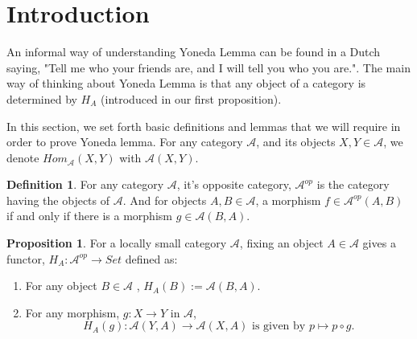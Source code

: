 \documentclass[a4paper]{article}
\theoremstyle{definition}
\newtheorem{definition}[theorem]{Definition}
\newtheorem{prop}[theorem]{Proposition}
\begin{document}
\section{Introduction}

An informal way of understanding Yoneda Lemma can be found in a Dutch saying, "Tell me who your
friends are, and I will tell you who you are.". The main way of thinking about Yoneda Lemma is
that any object of a category is determined by $H_A$ (introduced in our first proposition).

In this section, we set forth basic definitions and lemmas that we will require in
order to prove Yoneda lemma.
For any category $\mathcal{A}$, and its objects $X,Y\in \mathcal{A} $,
we denote $Hom_{\mathcal{A}}^{\mbox{}}(X,Y)$ with $\mathcal{A} (X,Y)$.

\begin{definition} %
	For any category $\mathcal{A} $, it's opposite category, $\mathcal{A}^{op}$
	is the category having the objects of $\mathcal{A}$.
	And for objects $A,B \in \mathcal{A} $, a morphism $f \in \mathcal{A}^{op} (A,B)$
	if and only if there is a morphism $g \in \mathcal{A}(B,A)$.
\end{definition}
\begin{prop} %
	For a locally small category $\mathcal{A}$, fixing an object $A \in \mathcal{A} $ gives
	a functor, $H_A: \mathcal{A} ^{op} \rightarrow Set$ defined as:
	\begin{enumerate}[label=(\roman*)]
		\item For any object $B \in \mathcal{A} $ , $H_A(B):=\mathcal{A} (B,A)$.
		\item For any morphism, $g : X \rightarrow Y $ in $\mathcal{A}$,
			\[H_A(g): \mathcal{A} (Y,A) \rightarrow \mathcal{A}(X,A)
			\text{ is given by } p \mapsto p \circ g.\]
	\end{enumerate}
\end{prop}
\end{document}
